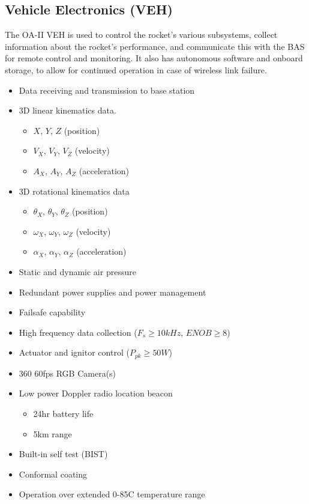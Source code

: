 \documentclass[12pt,article]{memoir}
\begin{document}
\subsection{Vehicle Electronics (VEH)}
The OA-II VEH is used to control the rocket's various subsystems, collect information about the rocket's performance, and communicate this with the BAS for remote control and monitoring. It also has autonomous software and onboard storage, to allow for continued operation in case of wireless link failure.
\begin{itemize}
	\item Data receiving and transmission to base station
	\item 3D linear kinematics data.
	\begin{itemize}
		\item $X$, $Y$, $Z$ (position)
		\item $V_X$, $V_Y$, $V_Z$ (velocity)
		\item $A_X$, $A_Y$, $A_Z$ (acceleration)
	\end{itemize}
	\item 3D rotational kinematics data
	\begin{itemize}
		\item $\theta_X$, $\theta_Y$, $\theta_Z$ (position)
		\item $\omega_X$, $\omega_Y$, $\omega_Z$ (velocity)
		\item $\alpha_X$, $\alpha_Y$, $\alpha_Z$ (acceleration)
	\end{itemize}
	\item Static and dynamic air pressure
	\item Redundant power supplies and power management
	\item Failsafe capability
	\item High frequency data collection ($F_s \geq 10kHz$, $ENOB \geq 8$)
	\item Actuator and ignitor control ($P_{pk} \geq 50W$)
	\item 360\textdegree{} 60fps RGB Camera(s)
	\item Low power Doppler radio location beacon
	\begin{itemize}
		\item 24hr battery life
		\item 5km range
	\end{itemize}
	\item Built-in self test (BIST)
	\item Conformal coating
	\item Operation over extended 0-85\degree C temperature range
\end{itemize}
\end{document}
